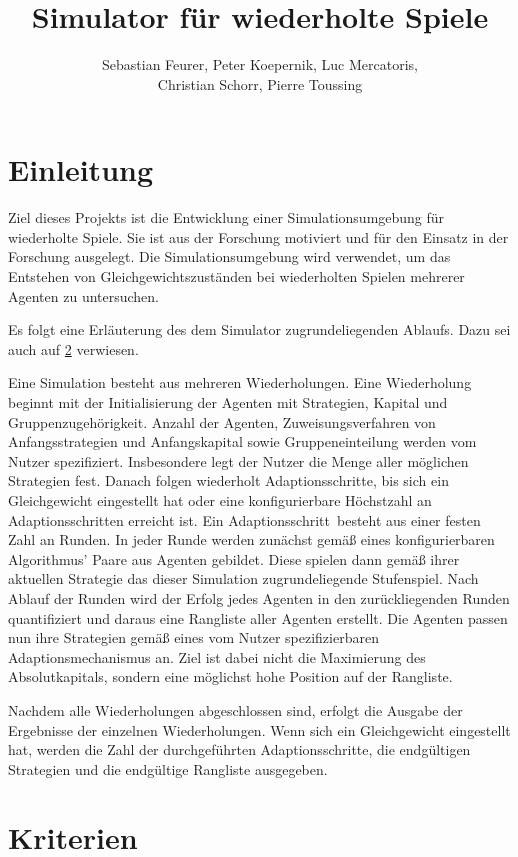 \documentclass[parskip=full,11pt,twoside]{scrartcl}
\title{Simulator für wiederholte Spiele}
\author{Sebastian Feurer, Peter Koepernik, Luc Mercatoris,\\Christian Schorr, Pierre Toussing}
\def\adapt{Adaptionsschritt}
\def\adapts{Adaptionsschritte}
\begin{document}
\maketitle

\section{Einleitung}

Ziel dieses Projekts ist die Entwicklung einer Simulationsumgebung für wiederholte Spiele. Sie ist aus der Forschung motiviert und für den Einsatz in der Forschung ausgelegt. Die Simulationsumgebung wird verwendet, um das Entstehen von Gleichgewichtszuständen bei wiederholten Spielen mehrerer Agenten zu untersuchen. 

Es folgt eine Erläuterung des dem Simulator zugrundeliegenden Ablaufs. Dazu sei auch auf \cref{} verwiesen.

Eine Simulation besteht aus mehreren Wiederholungen. Eine Wiederholung beginnt mit der Initialisierung der Agenten mit Strategien, Kapital und Gruppenzugehörigkeit. Anzahl der Agenten, Zuweisungsverfahren von Anfangsstrategien und Anfangskapital sowie Gruppeneinteilung werden vom Nutzer spezifiziert. Insbesondere legt der Nutzer die Menge aller möglichen Strategien fest. Danach folgen wiederholt \adapts, bis sich ein Gleichgewicht eingestellt hat oder eine konfigurierbare Höchstzahl an \adapts n erreicht ist. Ein \adapt\ besteht aus einer festen Zahl an Runden. In jeder Runde werden zunächst gemäß eines konfigurierbaren Algorithmus' Paare aus Agenten gebildet. Diese spielen dann gemäß ihrer aktuellen Strategie das dieser Simulation zugrundeliegende Stufenspiel. Nach Ablauf der Runden wird der Erfolg jedes Agenten in den zurückliegenden Runden quantifiziert und daraus eine Rangliste aller Agenten erstellt. Die Agenten passen nun ihre Strategien gemäß eines vom Nutzer spezifizierbaren Adaptionsmechanismus an. Ziel ist dabei nicht die Maximierung des Absolutkapitals, sondern eine möglichst hohe Position auf der Rangliste.

Nachdem alle Wiederholungen abgeschlossen sind, erfolgt die Ausgabe der Ergebnisse der einzelnen Wiederholungen. Wenn sich ein Gleichgewicht eingestellt hat, werden die Zahl der durchgeführten \adapts, die endgültigen Strategien und die endgültige Rangliste ausgegeben.

\pagebreak
\section{Kriterien}
\end{document}
